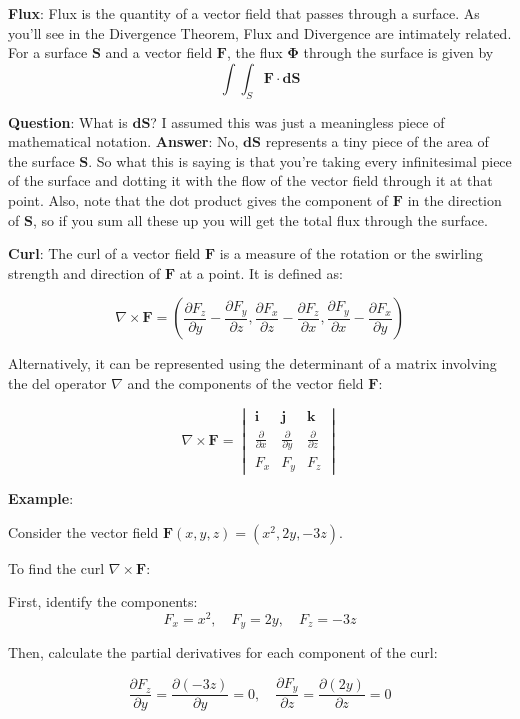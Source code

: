 \documentclass[12pt]{article}
\begin{document}
\textbf{Flux}: Flux is the quantity of a vector field that passes through a surface. As you'll see in the Divergence Theorem, Flux and Divergence are intimately related. For a surface \(\mathbf{S}\) and a vector field \(\mathbf{F}\), the flux \(\mathbf{\Phi}\) through the surface is given by 
\[\int \int_S \mathbf{F}\cdot \mathbf{dS}\]

\textbf{Question}: What is \(\mathbf{dS}\)? I assumed this was just a meaningless piece of mathematical notation. 
\textbf{Answer}: No, \(\mathbf{dS}\) represents a tiny piece of the area of the surface \(\mathbf{S}\). So what this is saying is that you're taking every infinitesimal piece of the surface and dotting it with the flow of the vector field through it at that point. Also, note that the dot product gives the component of \(\mathbf{F}\) in the direction of \(\mathbf{S}\), so if you sum all these up you will get the total flux through the surface.

\textbf{Curl}: The curl of a vector field \(\mathbf{F}\) is a measure of the rotation or the swirling strength and direction of \(\mathbf{F}\) at a point. It is defined as:

\[
\nabla \times \mathbf{F} = \left( \frac{\partial F_z}{\partial y} - \frac{\partial F_y}{\partial z}, \frac{\partial F_x}{\partial z} - \frac{\partial F_z}{\partial x}, \frac{\partial F_y}{\partial x} - \frac{\partial F_x}{\partial y} \right)
\]

Alternatively, it can be represented using the determinant of a matrix involving the del operator \(\nabla\) and the components of the vector field \(\mathbf{F}\):

\[
\nabla \times \mathbf{F} = 
\begin{vmatrix}
\mathbf{i} & \mathbf{j} & \mathbf{k} \\
\frac{\partial}{\partial x} & \frac{\partial}{\partial y} & \frac{\partial}{\partial z} \\
F_x & F_y & F_z
\end{vmatrix}
\]

\textbf{Example}:

Consider the vector field \(\mathbf{F}(x, y, z) = (x^2, 2y, -3z)\).

To find the curl \(\nabla \times \mathbf{F}\):

First, identify the components:
\[
F_x = x^2, \quad F_y = 2y, \quad F_z = -3z
\]

Then, calculate the partial derivatives for each component of the curl:

\[
\frac{\partial F_z}{\partial y} = \frac{\partial (-3z)}{\partial y} = 0, \quad \frac{\partial F_y}{\partial z} = \frac{\partial (2y)}{\partial z} = 0
\]
\end{document}

